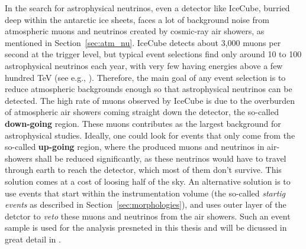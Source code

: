 In the search for astrophysical neutrinos, even a detector like IceCube, burried deep within the antarctic ice sheets, faces a lot of background noise from atmospheric muons and neutrinos created by cosmic-ray air showers, as mentioned in Section~\ref{sec:atm_nu}. IceCube detects about 3,000 muons per second at the trigger level, but typical event selections find only around 10 to 100 astrophysical neutrinos each year, with very few having energies above a few hundred TeV (see e.g., ). Therefore, the main goal of any event selection is to reduce atmospheric backgrounds enough so that astrophysical neutrinos can be detected. The high rate of muons observed by IceCube is due to the overburden of atmospheric air showers coming straight down the detector, the so-called \textbf{down-going} region. These muons contributes as the largest background for astrophysical studies. Ideally, one could look for events that only come from the so-called \textbf{up-going} region, where the produced muons and neutrinos in air-showers shall be reduced significantly, as these neutrinos would have to travel through earth to reach the detector, which most of them don't survive. This solution comes at a cost of loosing half of the sky. An alternative solution is to use events that start within the instrumentation volume (the so-called \emph{startig events} as described in Section~\ref{sec:morphologies}), and uses outer layer of the detctor to \emph{veto} these muons and neutrinos from the air showers. Such an event sample is used for the analysis presneted in this thesis and will be dicussed in great detail in .

